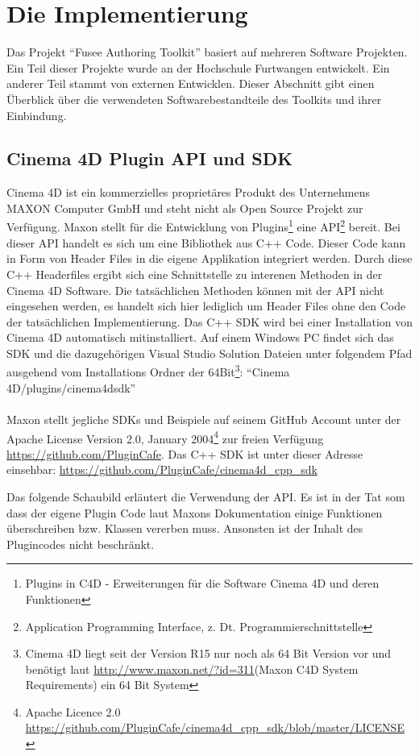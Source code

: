 \documentclass[pagesize, paper=a4, fontsize=12pt,titlepage=true, headings=small, headnosepline, abstractoff, liststotoc, nochapterprefix, plainheadsepline, twoside]{scrreprt}
\begin{document}
\section{Die Implementierung}
Das Projekt “Fusee Authoring Toolkit” basiert auf mehreren Software Projekten. Ein Teil dieser Projekte wurde an der Hochschule Furtwangen entwickelt. Ein anderer Teil stammt von externen Entwicklen. Dieser Abschnitt gibt einen Überblick über die verwendeten Softwarebestandteile des Toolkits und ihrer Einbindung.

\subsection{Cinema 4D Plugin API und SDK}
Cinema 4D \autocite{MaxonC4d2014} ist ein kommerzielles proprietäres Produkt des Unternehmens MAXON Computer GmbH und steht nicht als Open Source Projekt zur Verfügung. Maxon stellt für die Entwicklung von Plugins\footnote{Plugins in C4D - Erweiterungen für die Software Cinema 4D und deren Funktionen} eine API\footnote{Application Programming Interface, z. Dt. Programmierschnittstelle} bereit. Bei dieser API handelt es sich um eine Bibliothek aus C++ Code. Dieser Code kann in Form von Header Files in die eigene Applikation integriert werden. Durch diese C++ Headerfiles ergibt sich eine Schnittstelle zu interenen Methoden in der Cinema 4D Software. Die tatsächlichen Methoden können mit der API nicht eingesehen werden, es handelt sich hier lediglich um Header Files ohne den Code der tatsächlichen Implementierung. Das C++ SDK wird bei einer Installation von Cinema 4D automatisch mitinstalliert. Auf einem Windows PC findet sich das SDK und die dazugehörigen Visual Studio Solution Dateien unter folgendem Pfad ausgehend vom Installations Ordner der 64Bit\footnote{Cinema 4D liegt seit der Version R15 nur noch als 64 Bit Version vor und benötigt laut \url{http://www.maxon.net/?id=311}(Maxon C4D System Requirements) ein 64 Bit System}: {“Cinema 4D/plugins/cinema4dsdk”}
\\
\\
Maxon stellt jegliche SDKs und Beispiele auf seinem GitHub Account unter der Apache License Version 2.0, January 2004\footnote{Apache Licence 2.0 \url{https://github.com/PluginCafe/cinema4d_cpp_sdk/blob/master/LICENSE}} zur freien Verfügung \url{https://github.com/PluginCafe}. Das C++ SDK ist unter dieser Adresse einsehbar: \url{https://github.com/PluginCafe/cinema4d_cpp_sdk}

Das folgende Schaubild erläutert die Verwendung der API. Es ist in der Tat som dass der eigene Plugin Code laut Maxons Dokumentation einige Funktionen überschreiben bzw. Klassen vererben muss. Ansonsten ist der Inhalt des Plugincodes nicht beschränkt. 
\end{document}
